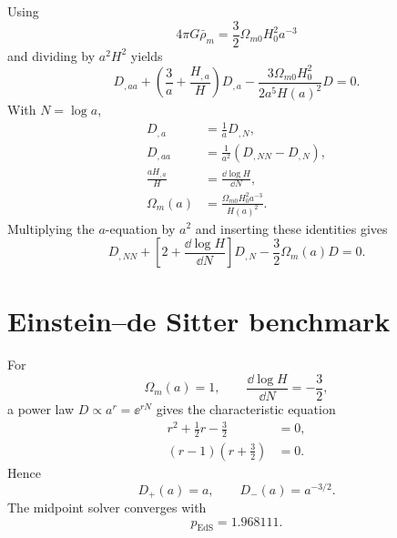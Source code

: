 Using
\begin{equation}
4\pi G\bar\rho_m
=\frac32\Omega_{m0}H_0^2a^{-3}
\end{equation}
and dividing by \(a^2H^2\) yields
\begin{equation}
\boxed{
D_{,aa}
+\left(\frac3a+\frac{H_{,a}}{H}\right)D_{,a}
-\frac{3\Omega_{m0}H_0^2}{2a^5H(a)^2}D=0.
}
\end{equation}
With \(N=\log a\),
\begin{align}
D_{,a}&=\frac1aD_{,N},\\
D_{,aa}&=\frac1{a^2}
\left(D_{,NN}-D_{,N}\right),\\
\frac{aH_{,a}}{H}
&=\frac{\dd\log H}{\dd N},\\
\Omega_m(a)
&=\frac{\Omega_{m0}H_0^2a^{-3}}{H(a)^2}.
\end{align}
Multiplying the \(a\)-equation by \(a^2\) and inserting these identities gives
\begin{equation}
\boxed{
D_{,NN}
+\left[2+\frac{\dd\log H}{\dd N}\right]D_{,N}
-\frac32\Omega_m(a)D=0.
}
\end{equation}

\section{Einstein--de Sitter benchmark}
For
\begin{equation}
\Omega_m(a)=1,
\qquad
\frac{\dd\log H}{\dd N}=-\frac32,
\end{equation}
a power law \(D\propto a^r=\ee^{rN}\) gives the characteristic equation
\begin{align}
r^2+\frac12r-\frac32&=0,\\
(r-1)\left(r+\frac32\right)&=0.
\end{align}
Hence
\begin{equation}
\boxed{
D_+(a)=a,
\qquad
D_-(a)=a^{-3/2}.
}
\end{equation}
The midpoint solver converges with
\begin{equation}
p_{\mathrm{EdS}}=1.968111.
\end{equation}

